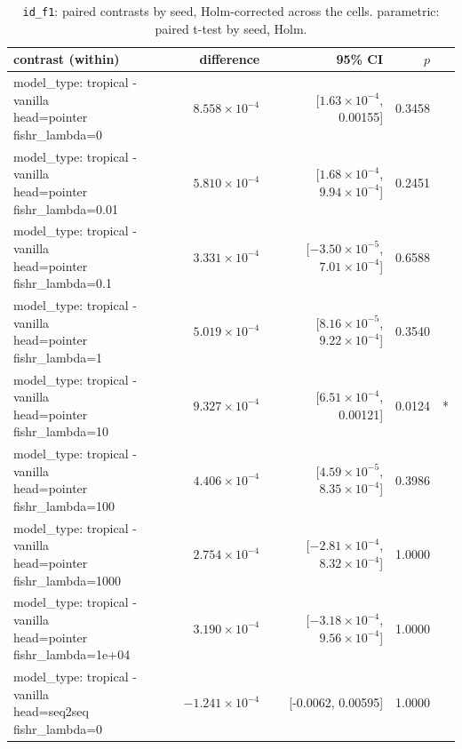 \documentclass[10pt]{article}
\makeatletter
\newcommand{\stackcell}[1]{\begin{tabular}[t]{@{}l@{}}#1\end{tabular}}
\makeatother
\begin{document}
{\small
\begin{longtable}{lrrrl}
\caption{\texttt{id\_f1}: paired contrasts by seed, Holm-corrected across the cells. parametric: paired t-test by seed, Holm.}\label{tab:paired-id_f1}\\
\toprule
contrast (within) & difference & 95\% CI & $p$ & \\
\midrule
\endhead
\stackcell{model\_type: tropical - vanilla\\\footnotesize head=pointer fishr\_lambda=0 } & $8.558\times10^{-4}$ & [$1.63\times10^{-4}$, 0.00155] & 0.3458 & \\
\stackcell{model\_type: tropical - vanilla\\\footnotesize head=pointer fishr\_lambda=0.01 } & $5.810\times10^{-4}$ & [$1.68\times10^{-4}$, $9.94\times10^{-4}$] & 0.2451 & \\
\stackcell{model\_type: tropical - vanilla\\\footnotesize head=pointer fishr\_lambda=0.1 } & $3.331\times10^{-4}$ & [$-3.50\times10^{-5}$, $7.01\times10^{-4}$] & 0.6588 & \\
\stackcell{model\_type: tropical - vanilla\\\footnotesize head=pointer fishr\_lambda=1 } & $5.019\times10^{-4}$ & [$8.16\times10^{-5}$, $9.22\times10^{-4}$] & 0.3540 & \\
\stackcell{model\_type: tropical - vanilla\\\footnotesize head=pointer fishr\_lambda=10 } & $9.327\times10^{-4}$ & [$6.51\times10^{-4}$, 0.00121] & 0.0124 & *\\
\stackcell{model\_type: tropical - vanilla\\\footnotesize head=pointer fishr\_lambda=100 } & $4.406\times10^{-4}$ & [$4.59\times10^{-5}$, $8.35\times10^{-4}$] & 0.3986 & \\
\stackcell{model\_type: tropical - vanilla\\\footnotesize head=pointer fishr\_lambda=1000 } & $2.754\times10^{-4}$ & [$-2.81\times10^{-4}$, $8.32\times10^{-4}$] & 1.0000 & \\
\stackcell{model\_type: tropical - vanilla\\\footnotesize head=pointer fishr\_lambda=1e+04 } & $3.190\times10^{-4}$ & [$-3.18\times10^{-4}$, $9.56\times10^{-4}$] & 1.0000 & \\
\stackcell{model\_type: tropical - vanilla\\\footnotesize head=seq2seq fishr\_lambda=0 } & $-1.241\times10^{-4}$ & [-0.0062, 0.00595] & 1.0000 & \\

\end{longtable}}
\end{document}
